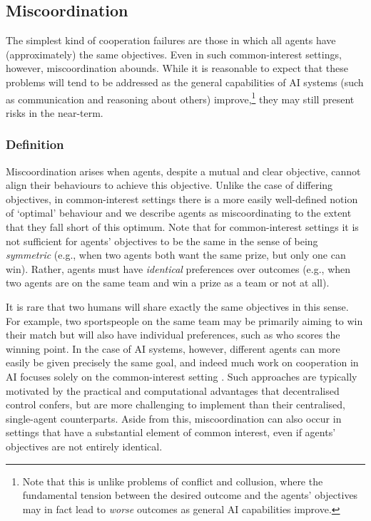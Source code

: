 \subsection{Miscoordination}
\label{sec:miscoordination}

The simplest kind of cooperation failures are those in which all agents have (approximately) the same objectives.
Even in such common-interest settings, however, miscoordination abounds.
While it is reasonable to expect that these problems will tend to be addressed as the general capabilities of AI systems (such as communication and reasoning about others) improve,\footnote{Note that this is unlike problems of conflict and collusion, where the fundamental tension between the desired outcome and the agents' objectives may in fact lead to \emph{worse} outcomes as general AI capabilities improve.} they may still present risks in the near-term.


\subsubsection{Definition}

Miscoordination arises when agents, despite a mutual and clear objective, cannot align their behaviours to achieve this objective.
Unlike the case of differing objectives, in common-interest settings there is a more easily well-defined notion of `optimal' behaviour and we describe agents as miscoordinating to the extent that they fall short of this optimum.
Note that for common-interest settings it is not sufficient for agents' objectives to be the same in the sense of being \textit{symmetric} (e.g., when two agents both want the same prize, but only one can win).
Rather, agents must have \textit{identical} preferences over outcomes (e.g., when two agents are on the same team and win a prize as a team or not at all).

It is rare that two humans will share exactly the same objectives in this sense.
For example, two sportspeople on the same team may be primarily aiming to win their match but will also have individual preferences, such as who scores the winning point.
In the case of AI systems, however, different agents can more easily be given precisely the same goal, and indeed much work on cooperation in AI focuses solely on the common-interest setting \citep{boutilier1996planning,Peshkin2000,Stone2010,Omidshafiei2017,Rashid2018,Oroojlooy2022}.
Such approaches are typically motivated by the practical and computational advantages that decentralised control confers, but are more challenging to implement than their centralised, single-agent counterparts.
Aside from this, miscoordination can also occur in settings that have a substantial element of common interest, even if agents' objectives are not entirely identical.

